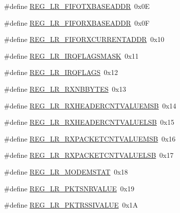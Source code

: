 \begin{DoxyCompactItemize}
\item 
\#define \mbox{\hyperlink{sx1276_regs-_lo_ra_8h_a317be2161e52b7ae141564e19598de85}{R\+E\+G\+\_\+\+L\+R\+\_\+\+F\+I\+F\+O\+T\+X\+B\+A\+S\+E\+A\+D\+DR}}~0x0E
\item 
\#define \mbox{\hyperlink{sx1276_regs-_lo_ra_8h_ad0c1f657286b341e8a305fcc546ff391}{R\+E\+G\+\_\+\+L\+R\+\_\+\+F\+I\+F\+O\+R\+X\+B\+A\+S\+E\+A\+D\+DR}}~0x0F
\item 
\#define \mbox{\hyperlink{sx1276_regs-_lo_ra_8h_ab571f7dfb8c742a652e427b983cc6962}{R\+E\+G\+\_\+\+L\+R\+\_\+\+F\+I\+F\+O\+R\+X\+C\+U\+R\+R\+E\+N\+T\+A\+D\+DR}}~0x10
\item 
\#define \mbox{\hyperlink{sx1276_regs-_lo_ra_8h_a2b50ca91ed7db2035a2183b37506eec8}{R\+E\+G\+\_\+\+L\+R\+\_\+\+I\+R\+Q\+F\+L\+A\+G\+S\+M\+A\+SK}}~0x11
\item 
\#define \mbox{\hyperlink{sx1276_regs-_lo_ra_8h_a29222ef4f73d911623275ebbb7ddbaf0}{R\+E\+G\+\_\+\+L\+R\+\_\+\+I\+R\+Q\+F\+L\+A\+GS}}~0x12
\item 
\#define \mbox{\hyperlink{sx1276_regs-_lo_ra_8h_a5443dae2a149465cebef0aa8aad4d8aa}{R\+E\+G\+\_\+\+L\+R\+\_\+\+R\+X\+N\+B\+B\+Y\+T\+ES}}~0x13
\item 
\#define \mbox{\hyperlink{sx1276_regs-_lo_ra_8h_aaf42f47bffbc4e33e7a4a10a81aee5e7}{R\+E\+G\+\_\+\+L\+R\+\_\+\+R\+X\+H\+E\+A\+D\+E\+R\+C\+N\+T\+V\+A\+L\+U\+E\+M\+SB}}~0x14
\item 
\#define \mbox{\hyperlink{sx1276_regs-_lo_ra_8h_a8153ac7c0d03f1c769485b112383a733}{R\+E\+G\+\_\+\+L\+R\+\_\+\+R\+X\+H\+E\+A\+D\+E\+R\+C\+N\+T\+V\+A\+L\+U\+E\+L\+SB}}~0x15
\item 
\#define \mbox{\hyperlink{sx1276_regs-_lo_ra_8h_aab224430e41cf39e050a92927b8a2e03}{R\+E\+G\+\_\+\+L\+R\+\_\+\+R\+X\+P\+A\+C\+K\+E\+T\+C\+N\+T\+V\+A\+L\+U\+E\+M\+SB}}~0x16
\item 
\#define \mbox{\hyperlink{sx1276_regs-_lo_ra_8h_a999636679ece11f0f6cb0ad058db863a}{R\+E\+G\+\_\+\+L\+R\+\_\+\+R\+X\+P\+A\+C\+K\+E\+T\+C\+N\+T\+V\+A\+L\+U\+E\+L\+SB}}~0x17
\item 
\#define \mbox{\hyperlink{sx1276_regs-_lo_ra_8h_ac633e60a75224b850dc8429394e80e7c}{R\+E\+G\+\_\+\+L\+R\+\_\+\+M\+O\+D\+E\+M\+S\+T\+AT}}~0x18
\item 
\#define \mbox{\hyperlink{sx1276_regs-_lo_ra_8h_a2b0bc71a6460bd6e97cf8a6717c90cc5}{R\+E\+G\+\_\+\+L\+R\+\_\+\+P\+K\+T\+S\+N\+R\+V\+A\+L\+UE}}~0x19
\item 
\#define \mbox{\hyperlink{sx1276_regs-_lo_ra_8h_ac7db39cc10de754e5e5d7065ca2c1796}{R\+E\+G\+\_\+\+L\+R\+\_\+\+P\+K\+T\+R\+S\+S\+I\+V\+A\+L\+UE}}~0x1A

\end{DoxyCompactItemize}
